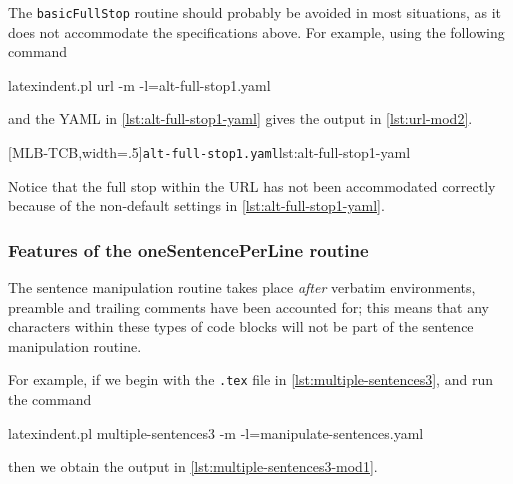  The \texttt{basicFullStop} routine should probably be avoided in most situations, as it
 does not accommodate the specifications above. For example, using the following command
  
 \begin{commandshell}
latexindent.pl url -m -l=alt-full-stop1.yaml
\end{commandshell}
 and the YAML in \cref{lst:alt-full-stop1-yaml} gives the output in \cref{lst:url-mod2}.

 \begin{cmhtcbraster}[ raster left skip=-3.5cm,
   raster right skip=-2cm,
   raster force size=false,
   raster column 1/.style={add to width=.1\textwidth},
   raster column skip=.06\linewidth]
  [MLB-TCB,width=.5\textwidth]{\texttt{alt-full-stop1.yaml}}{lst:alt-full-stop1-yaml}
 \end{cmhtcbraster}

 Notice that the full stop within the URL has not been accommodated correctly because of
 the non-default settings in \cref{lst:alt-full-stop1-yaml}.

\subsubsection{Features of the oneSentencePerLine routine}
 The sentence manipulation routine takes place \emph{after} verbatim  environments, preamble and trailing comments have been
 accounted for; this means that any characters within these types of code blocks will not
 be part of the sentence manipulation routine.

 For example, if we begin with the \texttt{.tex} file in \cref{lst:multiple-sentences3},
 and run the command  
 \begin{commandshell}
latexindent.pl multiple-sentences3 -m -l=manipulate-sentences.yaml
\end{commandshell}
 then we obtain the output in \cref{lst:multiple-sentences3-mod1}.

